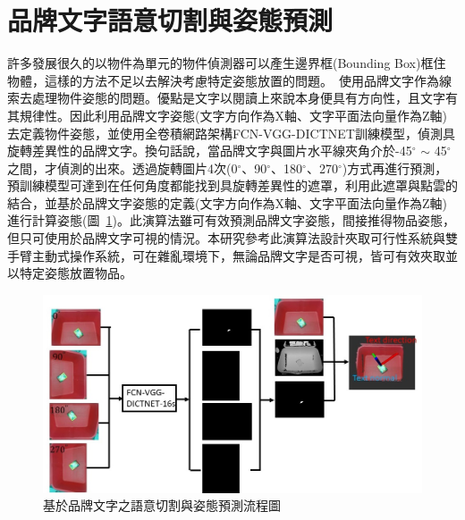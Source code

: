 \section{品牌文字語意切割與姿態預測}
許多發展很久的以物件為單元的物件偵測器可以產生邊界框(Bounding Box)框住物體，這樣的方法不足以去解決考慮特定姿態放置的問題。~\cite{peterthesis}使用品牌文字作為線索去處理物件姿態的問題。優點是文字以閱讀上來說本身便具有方向性，且文字有其規律性。因此利用品牌文字姿態(文字方向作為X軸、文字平面法向量作為Z軸)去定義物件姿態，並使用全卷積網路架構FCN-VGG-DICTNET訓練模型，偵測具旋轉差異性的品牌文字。換句話說，當品牌文字與圖片水平線夾角介於-45$^{\circ}$ $\sim$ 45$^{\circ}$ 之間，才偵測的出來。透過旋轉圖片4次(0$^{\circ}$、90$^{\circ}$、180$^{\circ}$、270$^{\circ}$)方式再進行預測，預訓練模型可達到在任何角度都能找到具旋轉差異性的遮罩，利用此遮罩與點雲的結合，並基於品牌文字姿態的定義(文字方向作為X軸、文字平面法向量作為Z軸)進行計算姿態(圖~\ref{figure:text-pose-extimation-pipeline})。此演算法雖可有效預測品牌文字姿態，間接推得物品姿態，但只可使用於品牌文字可視的情況。本研究參考此演算法設計夾取可行性系統與雙手臂主動式操作系統，可在雜亂環境下，無論品牌文字是否可視，皆可有效夾取並以特定姿態放置物品。

\begin{figure}[H]
	\centering
	\includegraphics[height=!, width=1.0\linewidth, keepaspectratio=true]
	{./figures/text-pose-extimation-pipeline.jpg}
  \caption{基於品牌文字之語意切割與姿態預測流程圖}
  \label{figure:text-pose-extimation-pipeline}
\end{figure}
